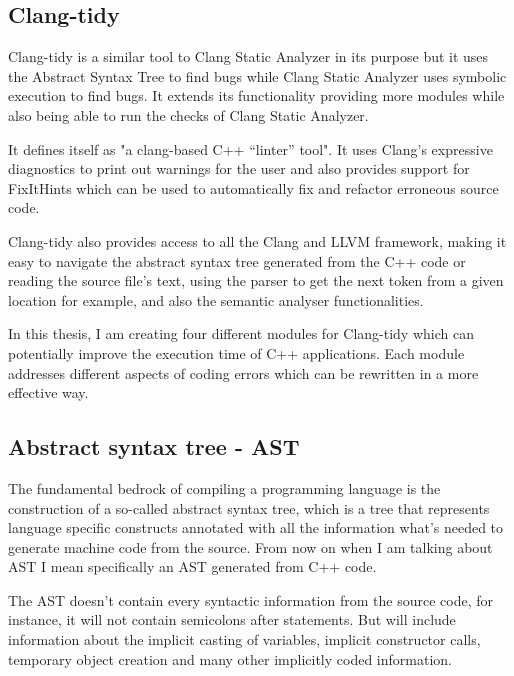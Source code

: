 \subsection{Clang-tidy}
\par Clang-tidy is a similar tool to Clang Static Analyzer in its purpose but it uses the Abstract Syntax Tree to find bugs while Clang Static Analyzer uses symbolic execution to find bugs. It extends its functionality providing more modules while also being able to run the checks of Clang Static Analyzer. \medskip
\par It defines itself as "a clang-based C++ “linter” tool"\cite{clang_tidy_mainpage}. It uses Clang's expressive diagnostics to print out warnings for the user and also provides support for FixItHints which can be used to automatically fix and refactor erroneous source code. \medskip
\par Clang-tidy also provides access to all the Clang and LLVM framework, making it easy to navigate the abstract syntax tree generated from the C++ code or reading the source file's text, using the parser to get the next token from a given location for example, and also the semantic analyser functionalities.\medskip
\par In this thesis, I am creating four different modules for Clang-tidy which can potentially improve the execution time of C++ applications. Each module addresses different aspects of coding errors which can be rewritten in a more effective way.
\subsection{Abstract syntax tree - AST}
\par The fundamental bedrock of compiling a programming language is the construction of a so-called abstract syntax tree, which is a tree that represents language specific constructs annotated with all the information what's needed to generate machine code from the source. From now on when I am talking about AST I mean specifically an AST generated from C++ code. \medskip
\par The AST doesn't contain every syntactic information from the source code, for instance, it will not contain semicolons after statements. But will include information about the implicit casting of variables, implicit constructor calls, temporary object creation and many other implicitly coded information.


